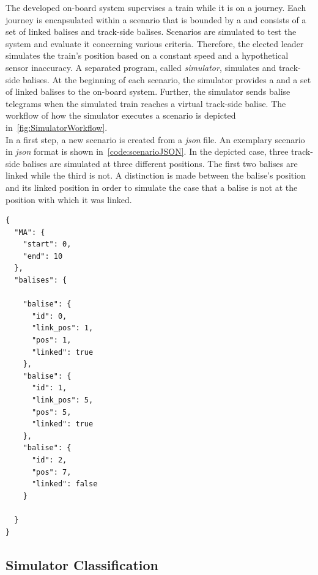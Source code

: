 The developed on-board system supervises a train while it is on a journey.
Each journey is encapsulated within a scenario that is bounded by a  and consists of a set of linked balises and track-side balises.
Scenarios are simulated to test the system and evaluate it concerning various criteria.
Therefore, the elected leader simulates the train's position based on a constant speed and a hypothetical sensor inaccuracy.
A separated program, called \textit{simulator}, simulates  and track-side balises.
At the beginning of each scenario, the simulator provides a  and a set of linked balises to the on-board system.
Further, the simulator sends balise telegrams when the simulated train reaches a virtual track-side balise.
The workflow of how the simulator executes a scenario is depicted in~\autoref{fig:SimulatorWorkflow}.
\\

In a first step, a new scenario is created from a \textit{json} file.
An exemplary scenario in \textit{json} format is shown in~\autoref{code:scenarioJSON}.
In the depicted case, three track-side balises are simulated at three different positions.
The first two balises are linked while the third is not.
A distinction is made between the balise's position and its linked position in order to simulate the case that a balise is not at the position with which it was linked.

\begin{minipage}{\linewidth}
\begin{lstlisting}[caption={The developed simulator simulates scenarios that are provided in \texttt{json} format. Each scenario consists of a \abr{MA} with a start and an end position, as well as a set of balises. Balises can either be linked or not and include an identification number, a linking position, and a position. The linking position is used to simulate a misplaced balise.}, label=code:scenarioJSON]
{
  "MA": {
    "start": 0,
    "end": 10
  },
  "balises": {

    "balise": {
      "id": 0,
      "link_pos": 1,
      "pos": 1,
      "linked": true
    },
    "balise": {
      "id": 1,
      "link_pos": 5,
      "pos": 5,
      "linked": true
    },
    "balise": {
      "id": 2,
      "pos": 7,
      "linked": false
    }

  }
}

\end{lstlisting}
\end{minipage}

\subsection{Simulator Classification}

